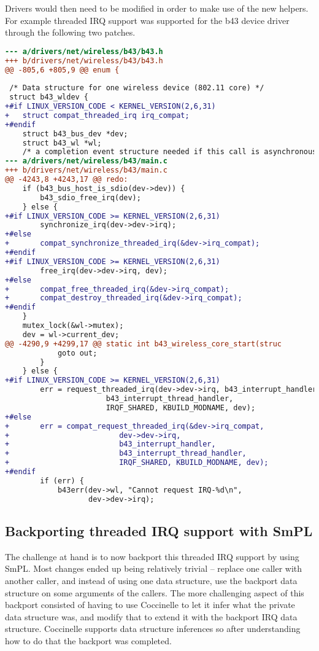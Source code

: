 \documentclass[a4paper,10pt]{article}
\begin{document}
Drivers would then need to be modified in order to make use of the new
helpers. For example threaded IRQ support was supported for the b43 device driver
through the following two patches.

\begin{lstlisting}[language=diff]
--- a/drivers/net/wireless/b43/b43.h
+++ b/drivers/net/wireless/b43/b43.h
@@ -805,6 +805,9 @@ enum {
 
 /* Data structure for one wireless device (802.11 core) */
 struct b43_wldev {
+#if LINUX_VERSION_CODE < KERNEL_VERSION(2,6,31)
+	struct compat_threaded_irq irq_compat;
+#endif
 	struct b43_bus_dev *dev;
 	struct b43_wl *wl;
 	/* a completion event structure needed if this call is asynchronous */
--- a/drivers/net/wireless/b43/main.c
+++ b/drivers/net/wireless/b43/main.c
@@ -4243,8 +4243,17 @@ redo:
 	if (b43_bus_host_is_sdio(dev->dev)) {
 		b43_sdio_free_irq(dev);
 	} else {
+#if LINUX_VERSION_CODE >= KERNEL_VERSION(2,6,31)
 		synchronize_irq(dev->dev->irq);
+#else
+		compat_synchronize_threaded_irq(&dev->irq_compat);
+#endif
+#if LINUX_VERSION_CODE >= KERNEL_VERSION(2,6,31)
 		free_irq(dev->dev->irq, dev);
+#else
+		compat_free_threaded_irq(&dev->irq_compat);
+		compat_destroy_threaded_irq(&dev->irq_compat);
+#endif
 	}
 	mutex_lock(&wl->mutex);
 	dev = wl->current_dev;
@@ -4290,9 +4299,17 @@ static int b43_wireless_core_start(struc
 			goto out;
 		}
 	} else {
+#if LINUX_VERSION_CODE >= KERNEL_VERSION(2,6,31)
 		err = request_threaded_irq(dev->dev->irq, b43_interrupt_handler,
 					   b43_interrupt_thread_handler,
 					   IRQF_SHARED, KBUILD_MODNAME, dev);
+#else
+		err = compat_request_threaded_irq(&dev->irq_compat,
+						  dev->dev->irq,
+						  b43_interrupt_handler,
+						  b43_interrupt_thread_handler,
+						  IRQF_SHARED, KBUILD_MODNAME, dev);
+#endif
 		if (err) {
 			b43err(dev->wl, "Cannot request IRQ-%d\n",
 			       dev->dev->irq);
\end{lstlisting}

\subsection{Backporting threaded IRQ support with SmPL}

The challenge at hand is to now backport this threaded IRQ support by using
SmPL. Most changes ended up being relatively trivial -- replace one caller with
another caller, and instead of using one data structure, use the backport data
structure on some arguments of the callers.  The more challenging aspect of
this backport consisted of having to use Coccinelle to let it infer what the
private data structure was, and modify that to extend it with the backport IRQ
data structure. Coccinelle supports data structure inferences so after
understanding how to do that the backport was completed.
\end{document}
